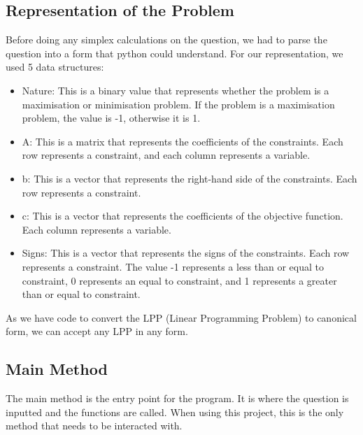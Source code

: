 \documentclass{article}
\numberwithin{equation}{section}
\begin{document}
\subsection{Representation of the Problem}
Before doing any simplex calculations on the question, we had to parse the question into a form that python could understand. For our representation, we used 5 data structures:
\begin{itemize}
    \item Nature: This is a binary value that represents whether the problem is a maximisation or minimisation problem. If the problem is a maximisation problem, the value is -1, otherwise it is 1.
    \item A: This is a matrix that represents the coefficients of the constraints. Each row represents a constraint, and each column represents a variable.
    \item b: This is a vector that represents the right-hand side of the constraints. Each row represents a constraint.
    \item c: This is a vector that represents the coefficients of the objective function. Each column represents a variable.
    \item Signs: This is a vector that represents the signs of the constraints. Each row represents a constraint. The value -1 represents a less than or equal to constraint, 0 represents an equal to constraint, and 1 represents a greater than or equal to constraint.
\end{itemize}
As we have code to convert the LPP (Linear Programming Problem) to canonical form, we can accept any LPP in any form.
\subsection{Main Method}
The main method is the entry point for the program. It is where the question is inputted and the functions are called. When using this project, this is the only method that needs to be interacted with.
\end{document}
